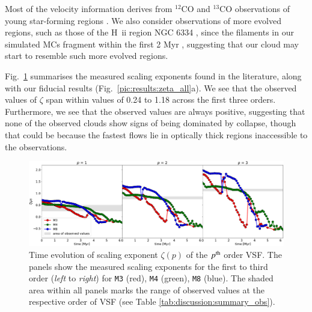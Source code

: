 

Most of the velocity information derives from $^{12}$CO and $^{13}$CO observations of young star-forming regions \citep[e.g., Perseus and Taurus][]{Padoan2003}.
We also consider observations of more evolved regions, such as those of the H~{\sc ii} region NGC 6334 \citep{Zernickel2015}, since the filaments in our simulated MCs fragment within the first 2 Myr , suggesting that our cloud may start to resemble such more evolved regions.

Fig.~\ref{pic:discussion:comp_observation} summarises the measured scaling exponents found in the literature, along with our fiducial results (Fig.~\ref{pic:results:zeta_all}a).
We see that the observed values of $\zeta$ span within values of 0.24 to 1.18 across the first three orders. 
Furthermore, we see that the observed values are always positive, suggesting that none of the observed clouds show signs of being dominated by collapse, though that could be because the fastest flows lie in optically thick regions inaccessible to the observations.  

\begin{figure}
	\includegraphics[width=\textwidth]{pics/compare_observations.pdf}
	\caption{
	Time evolution of scaling exponent $\zeta(p)$ of the $p^{\rm th}$ order VSF. 
	The panels show the measured scaling exponents for the first to third order (\textit{left} to \textit{right}) for \texttt{M3} (red), \texttt{M4} (green), \texttt{M8} (blue). 
	The shaded area within all panels marks the range of observed values at the respective order of VSF (see Table \ref{tab:discussion:summary_obs}).
	}
	\label{pic:discussion:comp_observation}
\end{figure}


